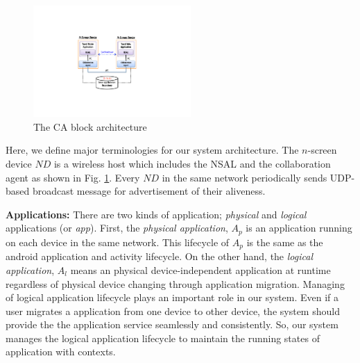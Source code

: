 \documentclass{sig-alternate}
\begin{document}

    \begin{figure}[htb] %
    \centering
    \includegraphics[width=6cm,keepaspectratio]{basicmodel}
    \caption{The CA block architecture}
    \label{fig:basicmodel}
    \end{figure}


Here, we define major terminologies for our system architecture. The $n$-screen device $ND$ is a wireless host which includes the NSAL and the collaboration agent as shown in Fig. \ref{fig:basicmodel}.  Every $ND$ in the same network periodically sends UDP-based broadcast message for advertisement of their aliveness.

\noindent
\textbf{Applications: }
There are two kinds of application; \textit{physical} and \textit{logical} applications (or \textit{app}).
First, the \textit{physical application}, $A_p$ is an application running on each device in the same network.  
This lifecycle of  $A_p$ is the same as the android application and activity lifecycle.
On the other hand, the \textit{logical application}, $A_l$ means an physical device-independent application at runtime regardless of physical device changing through application migration.
Managing of logical application lifecycle plays an important role in our system.
Even if a user migrates a application from one device to other device, 
the system should provide the the application service  seamlessly and consistently. 
So, our system manages the logical application lifecycle to maintain the running states of application with contexts.
\end{document}
